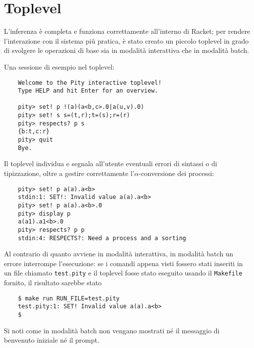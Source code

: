 \chapter{Toplevel}

L'inferenza \`e completa e funziona correttamente all'interno di Racket;
per rendere l'interazione con il sistema pi\`u pratica, \`e stato creato
un piccolo toplevel in grado di svolgere le operazioni di base sia in
modalit\`a interattiva che in modalit\`a batch.

Una sessione di esempio nel toplevel:

\begin{termlisting}
\begin{lstlisting}
    Welcome to the Pity interactive toplevel!
    Type HELP and hit Enter for an overview.

    pity> set! p !(a)(a<b,c>.0|a(u,v).0)
    pity> set! s s=(t,r);t=(s);r=(r)
    pity> respects? p s
    {b:t,c:r}
    pity> quit
    Bye.
\end{lstlisting}
\end{termlisting}

Il toplevel individua e segnala all'utente eventuali errori di sintassi
o di tipizzazione, oltre a gestire correttamente l'$\alpha$-conversione
dei processi:

\begin{termlisting}
\begin{lstlisting}
    pity> set! p a(a).a<b>
    stdin:1: SET!: Invalid value a(a).a<b>
    pity> set! p a(a).a<b>.0
    pity> display p
    a(a1).a1<b>.0
    pity> respects? p p
    stdin:4: RESPECTS?: Need a process and a sorting
\end{lstlisting}
\end{termlisting}

Al contrario di quanto avviene in modalit\`a interattiva, in modalit\`a
batch un errore interrompe l'esecuzione: se i comandi appena visti
fossero stati inseriti in un file chiamato \lstinline{test.pity} e il
toplevel fosse stato eseguito usando il \lstinline{Makefile} fornito,
il risultato sarebbe stato

\begin{termlisting}
\begin{lstlisting}
    $ make run RUN_FILE=test.pity
    test.pity:1: SET! Invalid value a(a).a<b>
    $
\end{lstlisting}
\end{termlisting}

Si noti come in modalit\`a batch non vengano mostrati n\'e il messaggio
di benvenuto iniziale n\'e il prompt.

